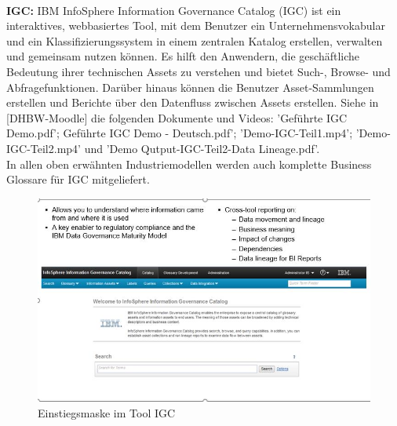 \documentclass[12pt]{article}
\begin{document}
\\[4.2cm] 
%
\textbf{IGC:} IBM InfoSphere Information Governance Catalog (IGC) ist ein interaktives, webbasiertes Tool, mit dem Benutzer ein Unternehmensvokabular und ein Klassifizierungssystem in einem zentralen Katalog erstellen, verwalten und gemeinsam nutzen können. Es hilft den Anwendern, die geschäftliche Bedeutung ihrer technischen Assets zu verstehen und bietet Such-, Browse- und Abfragefunktionen. Darüber hinaus können die Benutzer Asset-Sammlungen erstellen und Berichte über den Datenfluss zwischen Assets erstellen. Siehe in [DHBW-Moodle] die folgenden Dokumente und Videos:
'Geführte IGC Demo.pdf'; Geführte IGC Demo - Deutsch.pdf'; 'Demo-IGC-Teil1.mp4'; 'Demo-IGC-Teil2.mp4' und 'Demo Qutput-IGC-Teil2-Data Lineage.pdf'. \\
In allen oben erwähnten Industriemodellen werden auch komplette Business Glossare für IGC mitgeliefert. \\[0.2cm] 
%
\begin{figure}[htp]
  \centering
  \hspace*{-0.3cm} 
  \includegraphics[width=1.1\textwidth]{IGC-Overview}
  \caption{Einstiegsmaske im Tool  IGC}
  \label{fig:IGC-Overview}
\end{figure}
%
\\[0.2cm] 
%
\end{document}
